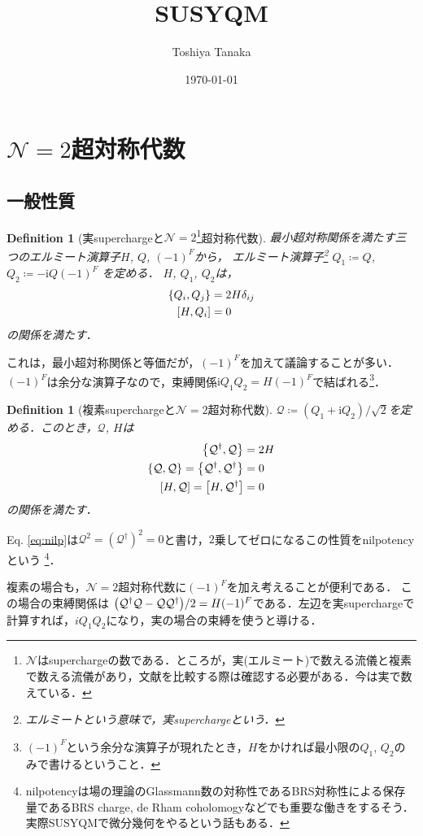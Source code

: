 \documentclass[english, dvipdfmx, a4paper]{jsarticle}
\title{SUSYQM}
\author{Toshiya Tanaka}
\date{\today}
\theoremstyle{break}
\newtheorem{defn}[thm]{Definition}
\renewcommand{\i}{\mathrm{i}}
\newcommand{\N}{\mathcal{N}}
\newcommand{\Q}{\mathcal{Q}}
\begin{document}
\section{\texorpdfstring{$\N=2$}{N=2}超対称代数}
	\subsection{一般性質}
	\begin{defn}[実superchargeと$\N = 2$\footnote{$\N$はsuperchargeの数である．ところが，実(エルミート)で数える流儀と複素で数える流儀があり，文献を比較する際は確認する必要がある．今は実で数えている．}超対称代数]
		最小超対称関係を満たす三つのエルミート演算子$H$, $Q$, $(-1)^{F}$から，
		エルミート演算子\footnote{エルミートという意味で，実superchargeという．}
		$Q_1 \coloneqq Q$, $Q_2\coloneqq -\i Q(-1)^{F}$
		を定める．
		$H$, $Q_1$, $Q_2$は，		\begin{align}
			\qty{Q_i, Q_j} &= 2H\delta_{ij}\\
			\qty[H, Q_i] &= 0
		\end{align}
		の関係を満たす．
	\end{defn}
	これは，最小超対称関係と等価だが，$(-1)^{F}$を加えて議論することが多い．
	$(-1)^{F}$は余分な演算子なので，束縛関係$\i Q_1Q_2 = H(-1)^F$で結ばれる\footnote{$(-1)^{F}$という余分な演算子が現れたとき，$H$をかければ最小限の$Q_1$, $Q_2$のみで書けるということ．}．
	\begin{defn}[複素superchargeと$\N = 2$超対称代数]
		$\Q \coloneqq (Q_1 + \i Q_2)/\sqrt{2}$を定める．このとき，$\Q$, $H$は
		\begin{align}
			\qty{\Q^{\dag}, \Q} &= 2H\\
			\qty{\Q, \Q} = \qty{\Q^{\dag}, \Q^{\dag}} &= 0 \label{eq:nilp}\\
			\qty[H, \Q] = \qty[H, \Q^{\dag}] &= 0
		\end{align}
		の関係を満たす．
	\end{defn}
	Eq. \eqref{eq:nilp}は$\Q^2 = (\Q^{\dag})^2 = 0$と書け，$2$乗してゼロになるこの性質をnilpotencyという
	\footnote{nilpotencyは場の理論のGlassmann数の対称性であるBRS対称性による保存量であるBRS charge, de Rham coholomogyなどでも重要な働きをするそう．実際SUSYQMで微分幾何をやるという話もある．}．
	
	複素の場合も，$\N = 2$超対称代数に$(-1)^F$を加え考えることが便利である．
	この場合の束縛関係は
	$\qty(\Q^{\dag}\Q - \Q\Q^{\dag})/2 = H(-1)^{F}$である．左辺を実superchargeで計算すれば，$iQ_1Q_2$になり，実の場合の束縛を使うと導ける．
\end{document}
